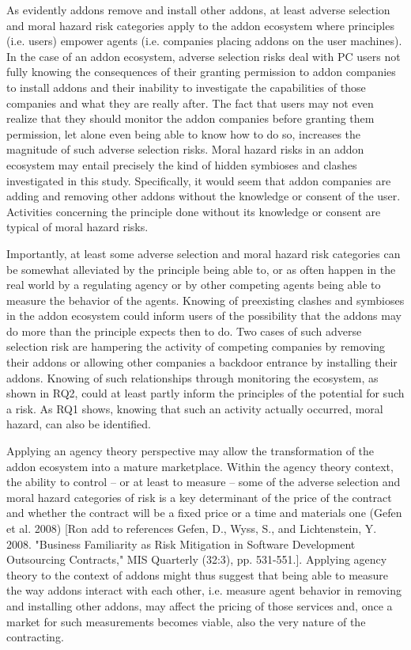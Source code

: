 \documentclass{article} %
\begin{document}
As evidently addons remove and install other addons, at least adverse selection and moral hazard risk categories apply to the addon ecosystem where principles (i.e. users) empower agents (i.e. companies placing addons on the user machines). In the case of an addon ecosystem, adverse selection risks deal with PC users not fully knowing the consequences of their granting permission to addon companies to install addons and their inability to investigate the capabilities of those companies and what they are really after. The fact that users may not even realize that they should monitor the addon companies before granting them permission, let alone even being able to know how to do so, increases the magnitude of such adverse selection risks. Moral hazard risks in an addon ecosystem may entail precisely the kind of hidden symbioses and clashes investigated in this study. Specifically, it would seem that addon companies are adding and removing other addons without the knowledge or consent of the user. Activities concerning the principle done without its knowledge or consent are typical of moral hazard risks. 

Importantly, at least some adverse selection and moral hazard risk categories can be somewhat alleviated by the principle being able to, or as often happen in the real world by a regulating agency or by other competing agents being able to measure the behavior of the agents. Knowing of preexisting clashes and symbioses in the addon ecosystem could inform users of the possibility that the addons may do more than the principle expects then to do. Two cases of such adverse selection risk are hampering the activity of competing companies by removing their addons or allowing other companies a backdoor entrance by installing their addons. Knowing of such relationships through monitoring the ecosystem, as shown in RQ2, could at least partly inform the principles of the potential for such a risk. As RQ1 shows, knowing that such an activity actually occurred, moral hazard, can also be identified. 

Applying an agency theory perspective may allow the transformation of the addon ecosystem into a mature marketplace. Within the agency theory context, the ability to control -- or at least to measure -- some of the adverse selection and moral hazard categories of risk is a key determinant of the price of the contract and whether the contract will be a fixed price or a time and materials one (Gefen et al. 2008) [Ron add to references Gefen, D., Wyss, S., and Lichtenstein, Y. 2008. "Business Familiarity as Risk Mitigation in Software Development Outsourcing Contracts," MIS Quarterly (32:3), pp. 531-551.]. Applying agency theory to the context of addons might thus suggest that being able to measure the way addons interact with each other, i.e. measure agent behavior in removing and installing other addons, may affect the pricing of those services and, once a market for such measurements becomes viable, also the very nature of the contracting. 
\end{document}
